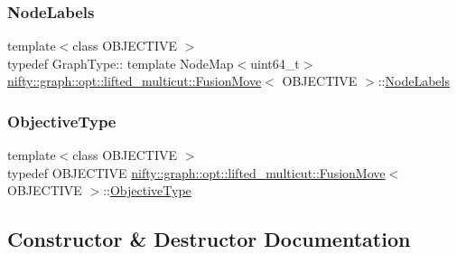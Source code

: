 \subsubsection{\texorpdfstring{Node\+Labels}{NodeLabels}}
{\footnotesize\ttfamily template$<$class O\+B\+J\+E\+C\+T\+I\+VE $>$ \\
typedef Graph\+Type\+:: template Node\+Map$<$uint64\+\_\+t$>$ \hyperlink{classnifty_1_1graph_1_1opt_1_1lifted__multicut_1_1FusionMove}{nifty\+::graph\+::opt\+::lifted\+\_\+multicut\+::\+Fusion\+Move}$<$ O\+B\+J\+E\+C\+T\+I\+VE $>$\+::\hyperlink{classnifty_1_1graph_1_1opt_1_1lifted__multicut_1_1FusionMove_adec543dc7249eea38fad43d6bedb8014}{Node\+Labels}}

\mbox{\label{classnifty_1_1graph_1_1opt_1_1lifted__multicut_1_1FusionMove_a1d10c7f91df1a4ef65d94e27126342d7}} 
\subsubsection{\texorpdfstring{Objective\+Type}{ObjectiveType}}
{\footnotesize\ttfamily template$<$class O\+B\+J\+E\+C\+T\+I\+VE $>$ \\
typedef O\+B\+J\+E\+C\+T\+I\+VE \hyperlink{classnifty_1_1graph_1_1opt_1_1lifted__multicut_1_1FusionMove}{nifty\+::graph\+::opt\+::lifted\+\_\+multicut\+::\+Fusion\+Move}$<$ O\+B\+J\+E\+C\+T\+I\+VE $>$\+::\hyperlink{classnifty_1_1graph_1_1opt_1_1lifted__multicut_1_1FusionMove_a1d10c7f91df1a4ef65d94e27126342d7}{Objective\+Type}}



\subsection{Constructor \& Destructor Documentation}
\mbox{\label{classnifty_1_1graph_1_1opt_1_1lifted__multicut_1_1FusionMove_aad28fcbfba24bc2f0b0865d7e58e56da}} 
